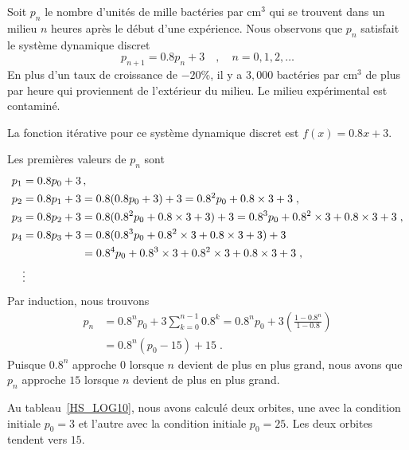 {\begin{egg}
Soit $p_n$ le nombre d'unités de mille bactéries par cm$^3$ qui se
trouvent dans un milieu $n$ heures après le début d'une expérience.
Nous observons que $p_n$ satisfait le système dynamique discret
\[
p_{n+1} = 0.8p_n + 3 \quad , \quad n=0, 1, 2, \ldots
\]
En plus d'un taux de croissance de $-20$\%, il y a $3,000$ bactéries
par cm$^3$ de plus par heure qui proviennent de l'extérieur du
milieu.  Le milieu expérimental est contaminé.

La fonction itérative pour ce système dynamique discret est
$f(x) =0.8x + 3$. 

Les premières valeurs de $p_n$ sont
\begin{align*}
p_1 &= 0.8 p_0 + 3 \, ,\\
p_2 &= 0.8 p_1 + 3 = 0.8 (0.8 p_0 + 3) + 3 = 0.8^2 p_0 + 0.8 \times 3 + 3 \;, \\
p_3 &= 0.8 p_2 + 3 = 0.8 (0.8^2 p_0 + 0.8\times 3 + 3) + 3
= 0.8^3 p_0 + 0.8^2 \times 3 + 0.8 \times 3 + 3 \; , \\
p_4 &= 0.8 p_3 + 3 = 0.8 (0.8^3 p_0 + 0.8^2 \times 3 +0.8\times 3 + 3) + 3 \\
& \hspace{5.3em} = 0.8^4 p_0 + 0.8^3 \times 3 + 0.8^2 \times 3
+ 0.8 \times 3 + 3 \; ,\\ 
& \vdots
\end{align*}
Par induction, nous trouvons
\begin{align*}
p_n &= 0.8^n p_0 + 3 \sum_{k=0}^{n-1} 0.8^k 
= 0.8^n p_0 + 3 \left( \frac{1-0.8^n}{1-0.8}\right) \\
&= 0.8^n (p_0 - 15) + 15 \; .
\end{align*}
Puisque $0.8^n$ approche $0$ lorsque $n$ devient de plus en plus
grand, nous avons que $p_n$ approche $15$ lorsque $n$ devient de plus en
plus grand.

Au tableau~\ref{HS_LOG10}, nous avons calculé deux orbites, une avec la
condition initiale $p_0 = 3$ et l'autre avec la condition initiale
$p_0 = 25$.  Les deux orbites tendent vers $15$.


\end{egg}}
